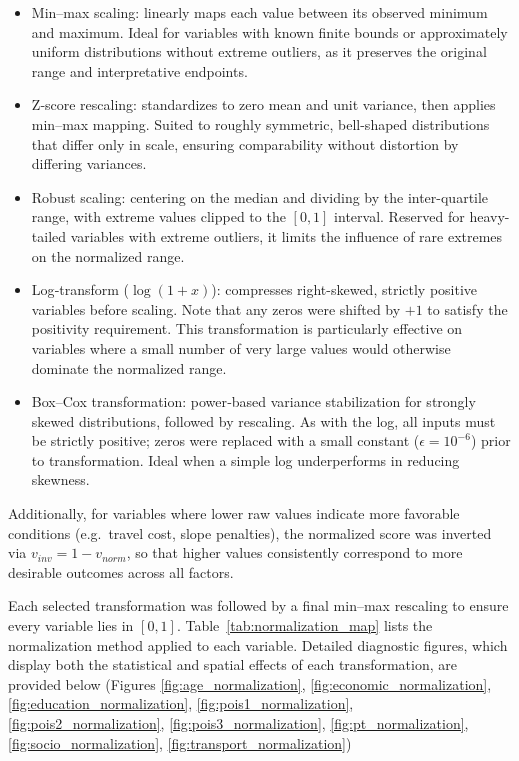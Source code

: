   \begin{itemize}
    \item  Min–max scaling: linearly maps each value between its observed minimum and maximum.  Ideal for variables with known finite bounds or approximately uniform distributions without extreme outliers, as it preserves the original range and interpretative endpoints.

    \item Z‐score rescaling: standardizes to zero mean and unit variance, then applies min–max mapping.  Suited to roughly symmetric, bell-shaped distributions that differ only in scale, ensuring comparability without distortion by differing variances.

    \item Robust scaling: centering on the median and dividing by the inter-quartile range, with extreme values clipped to the \([0,1]\) interval. Reserved for heavy-tailed variables with extreme outliers, it limits the influence of rare extremes on the normalized range.      

    \item Log‐transform (\(\log(1+x)\)): compresses right-skewed, strictly positive variables before scaling. Note that any zeros were shifted by \(+1\) to satisfy the positivity requirement. This transformation is particularly effective on variables where a small number of very large values would otherwise dominate the normalized range.

    \item Box–Cox transformation: power‐based variance stabilization for strongly skewed distributions, followed by rescaling. As with the log, all inputs must be strictly positive; zeros were replaced with a small constant (\(\epsilon=10^{-6}\)) prior to transformation. Ideal when a simple log underperforms in reducing skewness.

  \end{itemize}

  Additionally, for variables where lower raw values indicate more favorable conditions (e.g.\ travel cost, slope penalties), the normalized score was inverted via $v_{inv} = 1 - v_{norm}$,
  so that higher values consistently correspond to more desirable outcomes across all factors.

  Each selected transformation was followed by a final min–max rescaling to ensure every variable lies in \([0,1]\). Table~\ref{tab:normalization_map} lists the normalization method applied to each variable.  Detailed diagnostic figures, which display both the statistical and spatial effects of each transformation, are provided below (Figures \ref{fig:age_normalization}, \ref{fig:economic_normalization}, \ref{fig:education_normalization}, \ref{fig:pois1_normalization}, \ref{fig:pois2_normalization}, \ref{fig:pois3_normalization}, \ref{fig:pt_normalization}, \ref{fig:socio_normalization}, \ref{fig:transport_normalization})


